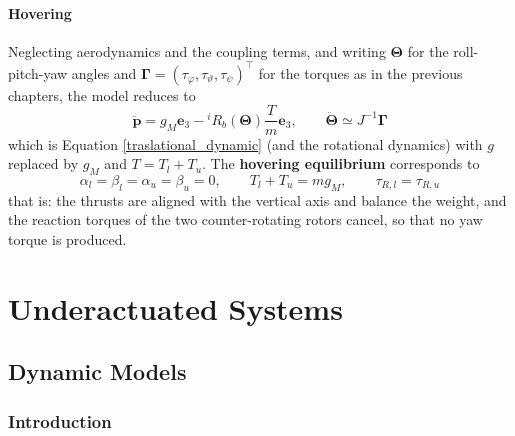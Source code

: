 \documentclass[10pt, a4paper]{report}
\begin{document}
\subsection{Hovering}
Neglecting aerodynamics and the coupling terms, and writing $\boldsymbol{\Theta}$ for the roll-pitch-yaw angles and $\boldsymbol{\Gamma}=(\tau_\varphi,\tau_\vartheta,\tau_\psi)^\top$ for the torques as in the previous chapters, the model reduces to\begin{equation}
    \ddot{\mathbf p}=g_M\mathbf e_3-{}^iR_b(\boldsymbol{\Theta})\frac{T}{m}\mathbf e_3,\qquad \ddot{\boldsymbol{\Theta}}\simeq J^{-1}\boldsymbol{\Gamma}
\end{equation}
which is Equation \eqref{traslational_dynamic} (and the rotational dynamics) with $g$ replaced by $g_M$ and $T=T_l+T_u$. The \textbf{hovering equilibrium} corresponds to\begin{equation}
    \alpha_l=\beta_l=\alpha_u=\beta_u=0,\qquad T_l+T_u=mg_M,\qquad \tau_{R,l}=\tau_{R,u}
\end{equation}
that is: the thrusts are aligned with the vertical axis and balance the weight, and the reaction torques of the two counter-rotating rotors cancel, so that no yaw torque is produced.
\part{Underactuated Systems}
\chapter{Dynamic Models}
\section{Introduction}
\todo{}
\end{document}
